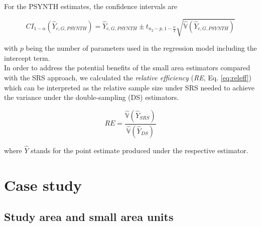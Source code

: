 \documentclass[remotesensing,article,submit,moreauthors,pdftex,10pt,a4paper]{mdpi}
\newcommand{\psynth}{PSYNTH}
\newcommand{\var}{\mathbb{V}}
\begin{document}
For the \psynth{} estimates, the confidence intervals are


\begin{equation}\label{ci_2phase_psynth}
CI_{1-\alpha}(\hat{Y}_{c,G,PSYNTH})=\hat{Y}_{c,G,PSYNTH} \pm t_{n_{2}-p, 1-\frac{\alpha}{2}}\sqrt{\hat{\var}(\hat{Y}_{c,G,PSYNTH})}
\end{equation}

\noindent with $p$ being the number of parameters used in the regression model including the intercept term.\\

In order to address the potential benefits of the small area estimators compared with the SRS approach, we calculated the \textit{relative efficiency} (\textit{RE}, Eq. \ref{eq:releff}) which can be interpreted as the relative sample size under SRS needed to achieve the variance under the double-sampling (DS) estimators.

\begin{equation}\label{eq:releff}
RE=\frac{\hat{\var}(\hat{Y}_{SRS})}{\hat{\var}(\hat{Y}_{DS})}
\end{equation}

where $\hat{Y}$ stands for the point estimate produced under the respective estimator.

\section{Case study}
\label{sec:CaseStudy}


\subsection{Study area and small area units}
\label{sec:studyarea}
\end{document}
